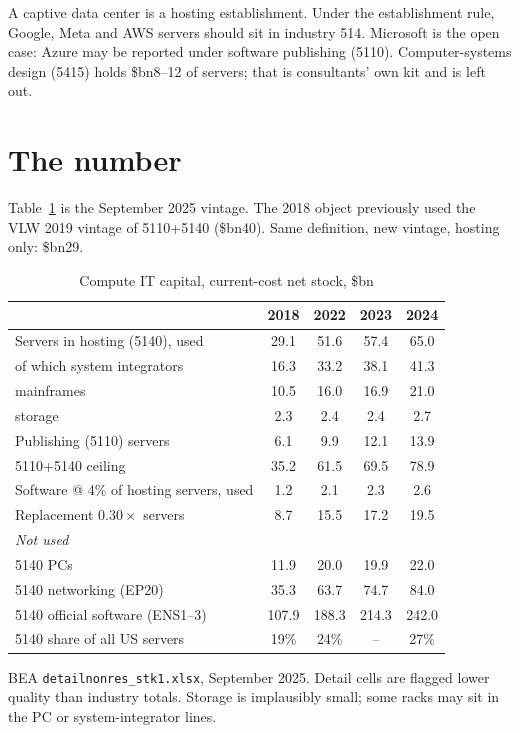 \documentclass[11pt]{article}
\newcommand{\bn}{\$bn}
\begin{document}
A captive data center is a hosting establishment. Under the establishment rule, Google, Meta and AWS servers should sit in industry 514. Microsoft is the open case: Azure may be reported under software publishing (5110). Computer-systems design (5415) holds \bn8--12 of servers; that is consultants' own kit and is left out.

\section{The number}

Table~\ref{tab:it} is the September 2025 vintage. The 2018 object previously used the VLW 2019 vintage of 5110+5140 (\bn40). Same definition, new vintage, hosting only: \bn29.

\begin{table}[ht]
\centering
\begin{threeparttable}
\caption{Compute IT capital, current-cost net stock, \bn}
\label{tab:it}
\begin{tabular}{lcccc}
\toprule
 & 2018 & 2022 & 2023 & 2024 \\
\midrule
Servers in hosting (5140), used & 29.1 & 51.6 & 57.4 & 65.0 \\
\quad of which system integrators & 16.3 & 33.2 & 38.1 & 41.3 \\
\quad mainframes & 10.5 & 16.0 & 16.9 & 21.0 \\
\quad storage & 2.3 & 2.4 & 2.4 & 2.7 \\
Publishing (5110) servers & 6.1 & 9.9 & 12.1 & 13.9 \\
5110+5140 ceiling & 35.2 & 61.5 & 69.5 & 78.9 \\
Software @ 4\% of hosting servers, used & 1.2 & 2.1 & 2.3 & 2.6 \\
Replacement $0.30\times$ servers & 8.7 & 15.5 & 17.2 & 19.5 \\
\midrule
\textit{Not used} & & & & \\
5140 PCs & 11.9 & 20.0 & 19.9 & 22.0 \\
5140 networking (EP20) & 35.3 & 63.7 & 74.7 & 84.0 \\
5140 official software (ENS1--3) & 107.9 & 188.3 & 214.3 & 242.0 \\
5140 share of all US servers & 19\% & 24\% & -- & 27\% \\
\bottomrule
\end{tabular}
\begin{tablenotes}\footnotesize
\item BEA \texttt{detailnonres\_stk1.xlsx}, September 2025. Detail cells are flagged lower quality than industry totals. Storage is implausibly small; some racks may sit in the PC or system-integrator lines.
\end{tablenotes}
\end{threeparttable}
\end{table}
\end{document}
